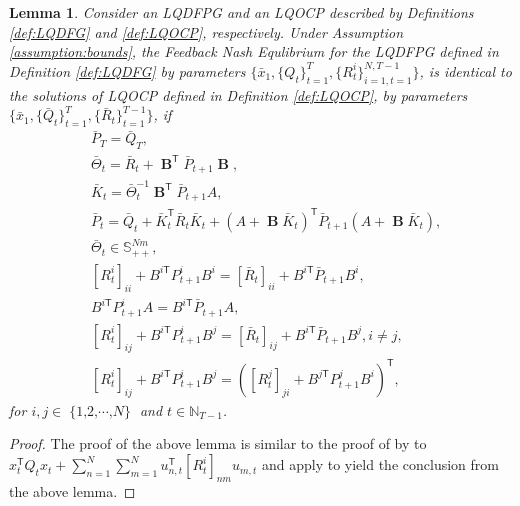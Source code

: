 \documentclass[letterpaper, 10 pt, conference]{ieeeconf}  %
\newcommand{\transpose}{\mathsf{T}}
\DeclareMathOperator{\contB}{\mathbf{B}}
\DeclareMathOperator{\Nplayers}{\{1,2,\cdots,\textit{N}\}}
\newtheorem{lemma}{Lemma}
\begin{document}
\begin{lemma}\label{lemma:gamePGrelation}
    Consider an LQDFPG and an LQOCP described by Definitions \ref{def:LQDFG} and \ref{def:LQOCP}, respectively. Under Assumption \ref{assumption:bounds}, the Feedback Nash Equlibrium for the LQDFPG defined in Definition \ref{def:LQDFG} by parameters $\{\bar{x}_{1},\{Q_{t}\}_{t=1}^{T},\{R_{t}^{i}\}_{i=1,t=1}^{N,T-1}\}$, is identical to the solutions of LQOCP defined in Definition \ref{def:LQOCP}, by parameters $\{\bar{x}_{1},\{\bar{Q}_{t}\}_{t=1}^{T},\{\bar{R}_{t}\}_{t=1}^{T-1}\}$, if
    \begin{align*}
        &\bar{P}_{T} = \bar{Q}_{T},\\
        &\bar{\Theta}_{t} = \bar{R}_{t} + \contB^{\transpose}\bar{P}_{t+1}\contB,\\
        &\bar{K}_{t} = \bar{\Theta}_{t}^{-1}\contB^{\transpose}\bar{P}_{t+1}A,\\
        &\bar{P}_{t} = \bar{Q}_{t} + \bar{K}_{t}^{\transpose}\bar{R}_{t}\bar{K}_{t} + (A+\contB\bar{K}_{t})^{\transpose}\bar{P}_{t+1}(A+\contB\bar{K}_{t}),\\
        &\bar{\Theta}_{t} \in \mathbb{S}_{++}^{Nm},\\
        &[R_{t}^{i}]_{ii} + B^{i\transpose}P_{t+1}^{i}B^{i} = [\bar{R}_{t}]_{ii} + B^{i\transpose}\bar{P}_{t+1}B^{i},\\
        &B^{i\transpose}P_{t+1}^{i}A = B^{i\transpose}\bar{P}_{t+1}A,\\
        &[R_{t}^{i}]_{ij} + B^{i\transpose}P_{t+1}^{i}B^{j} = [\bar{R}_{t}]_{ij} + B^{i\transpose}\bar{P}_{t+1}B^{j},i\neq j,\\
        &[R_{t}^{i}]_{ij} + B^{i\transpose}P_{t+1}^{i}B^{j} = ([R^{j}_{t}]_{ji} + B^{j\transpose}P^{j}_{t+1}B^{i})^{\transpose},
    \end{align*}
    for $i,j\in \Nplayers$ and $t \in \mathbb{N}_{T-1}$. 
\end{lemma}
\begin{proof}
    The proof of the above lemma is similar to the proof of \cite[Theorem 5]{prasad_structure_2023} by \cite[Equation (21c)]{prasad_structure_2023} to $x_{t}^{\transpose}Q_{t}x_{t} + \sum_{n=1}^{N}\sum_{m=1}^{N} u_{n,t}^{\transpose}[R_{t}^{i}]_{nm}u_{m,t}$ and apply \cite[Theorem 3]{prasad_structure_2023} to yield the conclusion from the above lemma.
\end{proof}
\end{document}
